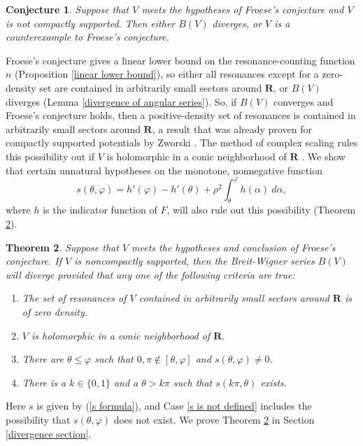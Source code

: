 \documentclass[reqno,12pt,letterpaper]{amsart}
\newcommand{\RR}{\mathbf{R}}
\newtheorem{theorem}{Theorem}[section]
\newtheorem{conjecture}[theorem]{Conjecture}
\theoremstyle{definition}
\begin{document}
\begin{conjecture}
\label{weak conjecture}
Suppose that $V$ meets the hypotheses of Froese's conjecture and $V$ is not compactly supported. Then either $B(V)$ diverges, or $V$ is a counterexample to Froese's conjecture.
\end{conjecture}
Froese's conjecture gives a linear lower bound on the resonance-counting function $n$ (Proposition \ref{linear lower bound}), so either all resonances except for a zero-density set are contained in arbitrarily small sectors around $\RR$, or $B(V)$ diverges (Lemma \ref{divergence of angular series}).
So, if $B(V)$ converges and Froese's conjecture holds, then a positive-density set of resonances is contained in arbitrarily small sectors around $\RR$, a result that was already proven for compactly supported potentials by Zworski \cite{zworski1987distribution}.
The method of complex scaling rules this possibility out if $V$ is holomorphic in a conic neighborhood of $\RR$ \cite[Corollary 12.14]{sjostrand2002lectures}. We show that certain unnatural hypotheses on the monotone, nonnegative function
\begin{equation}
\label{s formula}
s(\theta, \varphi) = h'(\varphi) - h'(\theta) + \rho^2 \int_\theta^\varphi h(\alpha)~d\alpha,
\end{equation}
where $h$ is the indicator function of $F$, will also rule out this possibility (Theorem \ref{divergence of breit wigner, preliminary version}).
\begin{theorem}
\label{divergence of breit wigner, preliminary version}
Suppose that $V$ meets the hypotheses and conclusion of Froese's conjecture. If $V$ is noncompactly supported, then the Breit-Wigner series $B(V)$ will diverge provided that any one of the following criteria are true:
\begin{enumerate}
\item The set of resonances of $V$ contained in arbitrarily small sectors around $\RR$ is of zero density. \label{resonances in sectors}
\item $V$ is holomorphic in a conic neighborhood of $\RR$. \label{holomorphic potential}
\item There are $\theta \leq \varphi$ such that $0,\pi \notin [\theta, \varphi]$ and $s(\theta, \varphi) \neq 0$. \label{s is not defined}
\item There is a $k \in \{0, 1\}$ and a $\theta > k\pi$ such that $s(k\pi, \theta)$ exists. \label{limit of s}
\end{enumerate}
\end{theorem}
Here $s$ is given by (\ref{s formula}), and Case \ref{s is not defined} includes the possibility that $s(\theta, \varphi)$ does not exist.
We prove Theorem \ref{divergence of breit wigner, preliminary version} in Section \ref{divergence section}.
\end{document}
